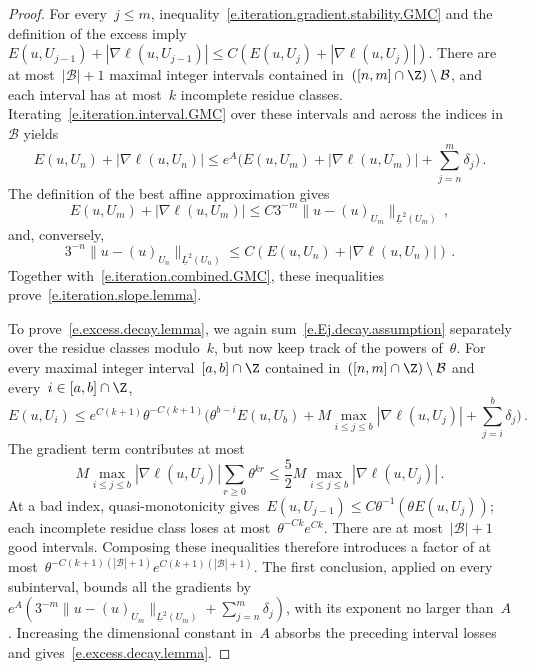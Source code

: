 \documentclass[11pt]{amsart}
\begin{document}
\begin{proof}
\smallskip

For every~$j\leq m$, inequality~\eqref{e.iteration.gradient.stability.GMC} and the definition of the excess imply~$E(u,U_{j-1})+|\nabla\ell(u,U_{j-1})|\leq C(E(u,U_j)+|\nabla\ell(u,U_j)|)$. There are at most~$|\mathcal B|+1$ maximal integer intervals contained in~$([n,m]\cap\Z)\setminus\mathcal B$, and each interval has at most~$k$ incomplete residue classes. Iterating~\eqref{e.iteration.interval.GMC} over these intervals and across the indices in~$\mathcal B$ yields
\begin{equation}
	E(u,U_n)+|\nabla\ell(u,U_n)|
	\leq e^A
	\biggl(E(u,U_m)+|\nabla\ell(u,U_m)|+\sum_{j=n}^{m}\delta_j\biggr)\,.
	\label{e.iteration.combined.GMC}
\end{equation}
The definition of the best affine approximation gives
\begin{equation*}
	E(u,U_m)+|\nabla\ell(u,U_m)|
	\leq C3^{-m}\|u-(u)_{U_m}\|_{\underline L^2(U_m)}
	\,,
\end{equation*}
and, conversely,
\begin{equation*}
	3^{-n}\|u-(u)_{U_n}\|_{\underline L^2(U_n)}
	\leq C(E(u,U_n)+|\nabla\ell(u,U_n)|)\,.
\end{equation*}
Together with~\eqref{e.iteration.combined.GMC}, these inequalities prove~\eqref{e.iteration.slope.lemma}.

\smallskip

To prove~\eqref{e.excess.decay.lemma}, we again sum~\eqref{e.Ej.decay.assumption} separately over the residue classes modulo~$k$, but now keep track of the powers of~$\theta$. For every maximal integer interval~$[a,b]\cap\Z$ contained in~$([n,m]\cap\Z)\setminus\mathcal B$ and every~$i\in[a,b]\cap\Z$,
\begin{equation*}
	E(u,U_i)
	\leq
	e^{C(k+1)}\theta^{-C(k+1)}
	\biggl(
	\theta^{b-i}E(u,U_b)
	+M\max_{i\leq j\leq b}|\nabla\ell(u,U_j)|
	+\sum_{j=i}^{b}\delta_j
	\biggr)\,.
\end{equation*}
The gradient term contributes at most
\begin{equation*}
	M\max_{i\leq j\leq b}|\nabla\ell(u,U_j)|\sum_{r\geq0}\theta^{kr}
	\leq\frac52M\max_{i\leq j\leq b}|\nabla\ell(u,U_j)|\,.
\end{equation*}
At a bad index, quasi-monotonicity gives~$E(u,U_{j-1})\leq C\theta^{-1}(\theta E(u,U_j))$; each incomplete residue class loses at most~$\theta^{-Ck}e^{Ck}$. There are at most~$|\mathcal B|+1$ good intervals. Composing these inequalities therefore introduces a factor of at most~$\theta^{-C(k+1)(|\mathcal B|+1)}e^{C(k+1)(|\mathcal B|+1)}$. The first conclusion, applied on every subinterval, bounds all the gradients by~$e^A(3^{-m}\|u-(u)_{U_m}\|_{\underline L^2(U_m)}+\sum_{j=n}^m\delta_j)$, with its exponent no larger than~$A$. Increasing the dimensional constant in~$A$ absorbs the preceding interval losses and gives~\eqref{e.excess.decay.lemma}.
\end{proof}
\end{document}
